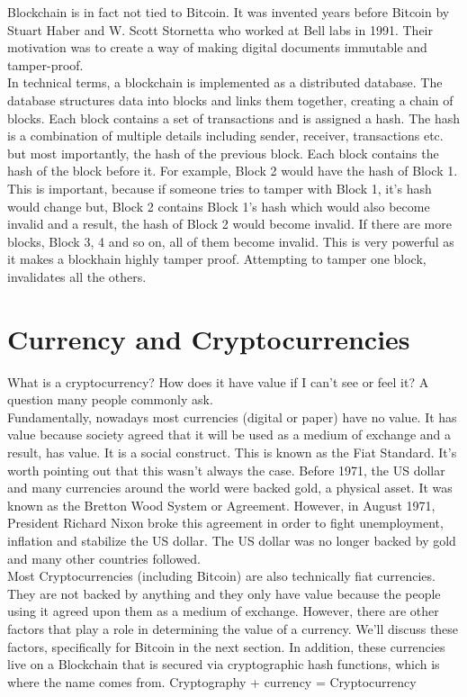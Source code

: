 \documentclass[11pt]{article} %
\begin{document}
\noindent Blockchain is in fact not tied to Bitcoin. It was invented years before Bitcoin by Stuart Haber and W. Scott Stornetta who worked at Bell labs in 1991. Their motivation was to create a way of making digital documents immutable and tamper-proof. \\

\noindent In technical terms, a blockchain is implemented as a distributed database. The database structures data into blocks and links them together, creating a chain of blocks. Each block contains a set of transactions and is assigned a hash. The hash is a combination of multiple details including sender, receiver, transactions etc.  but most importantly, the hash of the previous block. Each block contains the hash of the block before it. For example, Block 2 would have the hash of Block 1. This is important, because if someone tries to tamper with Block 1, it's hash would change but, Block 2 contains Block 1's hash which would also become invalid and a result, the hash of Block 2 would become invalid. If there are more blocks, Block 3, 4 and so on, all of them become invalid. This is very powerful as it makes a blockhain highly tamper proof. Attempting to tamper one block, invalidates all the others. \\

\section{Currency and Cryptocurrencies}{}
What is a cryptocurrency? How does it have value if I can't see or feel it? A question many people commonly ask.\\


\noindent Fundamentally, nowadays most currencies (digital or paper) have no value. It has value because society agreed that it will be used as a medium of exchange and a result, has value. It is a social construct. This is known as the Fiat Standard. It's worth pointing out that this wasn't always the case. Before 1971, the US dollar and many currencies around the world were backed gold, a physical asset. It was known as the Bretton Wood System or Agreement. However, in August 1971, President Richard Nixon broke this agreement in order to fight unemployment, inflation and stabilize the US dollar. The US dollar was no longer backed by gold and many other countries followed.\\


\noindent Most Cryptocurrencies (including Bitcoin) are also technically fiat currencies. They are not backed by anything and they only have value because the people using it agreed upon them as a medium of exchange. However, there are other factors that play a role in determining the value of a currency. We'll discuss these factors, specifically for Bitcoin in the next section. In addition, these currencies live on a Blockchain that is secured via cryptographic hash functions, which is where the name comes from. Cryptography + currency = Cryptocurrency\\
\end{document}
